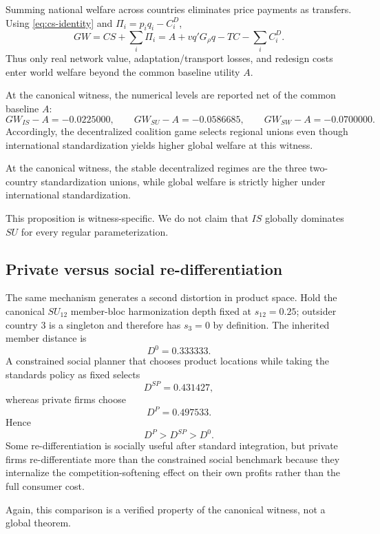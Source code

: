 Summing national welfare across countries eliminates price payments as transfers. Using \eqref{eq:cs-identity} and $\Pi_i=p_iq_i-C_i^D$,
\begin{equation}\label{eq:global-welfare}
GW=CS+\sum_i\Pi_i
=A+vq'G_\rho q-TC-\sum_iC_i^D.
\end{equation}
Thus only real network value, adaptation/transport losses, and redesign costs enter world welfare beyond the common baseline utility $A$.

At the canonical witness, the numerical levels are reported net of the common baseline $A$:
\[
GW_{IS}-A=-0.0225000,\qquad
GW_{SU}-A=-0.0586685,\qquad
GW_{SW}-A=-0.0700000.
\]
Accordingly, the decentralized coalition game selects regional unions even though international standardization yields higher global welfare at this witness.

\begin{proposition}\label{prop:global-wedge}
At the canonical witness, the stable decentralized regimes are the three two-country standardization unions, while global welfare is strictly higher under international standardization.
\end{proposition}

This proposition is witness-specific. We do not claim that $IS$ globally dominates $SU$ for every regular parameterization.

\subsection{Private versus social re-differentiation}

The same mechanism generates a second distortion in product space. Hold the canonical $SU_{12}$ member-bloc harmonization depth fixed at $s_{12}=0.25$; outsider country 3 is a singleton and therefore has $s_3=0$ by definition. The inherited member distance is
\[
D^0=0.333333.
\]
A constrained social planner that chooses product locations while taking the standards policy as fixed selects
\[
D^{SP}=0.431427,
\]
whereas private firms choose
\[
D^P=0.497533.
\]
Hence
\[
D^P>D^{SP}>D^0.
\]
Some re-differentiation is socially useful after standard integration, but private firms re-differentiate more than the constrained social benchmark because they internalize the competition-softening effect on their own profits rather than the full consumer cost.

Again, this comparison is a verified property of the canonical witness, not a global theorem.

